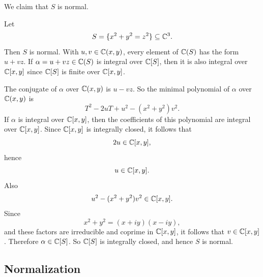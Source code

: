 We claim that $S$ is normal.

\begin{example}{
    Let
    \[
        S = \{x^2 + y^2 = z^2\}\subseteq \mathbb{C}^3.
    \]
    Then $S$ is normal.
}
    With $u,v\in \mathbb{C}(x,y)$, every element of $\mathbb{C}(S)$ has the form $u + vz$.
    If $\alpha = u + vz \in \mathbb{C}(S)$ is integral over $\mathbb{C}[S]$, then it is also integral over $\mathbb{C}[x,y]$ since $\mathbb{C}[S]$ is finite over $\mathbb{C}[x,y]$.

    The conjugate of $\alpha$ over $\mathbb{C}(x,y)$ is $u-vz$.
    So the minimal polynomial of $\alpha$ over $\mathbb{C}(x,y)$ is
    \[
        T^2 - 2uT + u^2 - (x^2+y^2)v^2.
    \]
    If $\alpha$ is integral over $\mathbb{C}[x,y]$, then the coefficients of this polynomial are integral over $\mathbb{C}[x,y]$.
    Since $\mathbb{C}[x,y]$ is integrally closed, it follows that
    \[
        2u \in \mathbb{C}[x,y],
    \]
    hence
    \[
        u\in \mathbb{C}[x,y].
    \]
    Also
    \[
        u^2 - (x^2+y^2)v^2 \in \mathbb{C}[x,y].
    \]
    Since
    \[
        x^2+y^2 = (x+iy)(x-iy),
    \]
    and these factors are irreducible and coprime in $\mathbb{C}[x,y]$, it follows that $v\in \mathbb{C}[x,y]$.
    Therefore $\alpha\in \mathbb{C}[S]$.
    So $\mathbb{C}[S]$ is integrally closed, and hence $S$ is normal.
\end{example}

\subsection{Normalization}

